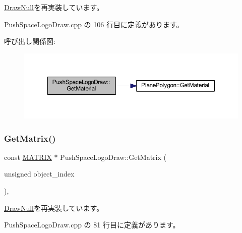 \mbox{\hyperlink{class_draw_null_a84969d22d3436986f214e9896fe44fc6}{Draw\+Null}}を再実装しています。



 Push\+Space\+Logo\+Draw.\+cpp の 106 行目に定義があります。

呼び出し関係図\+:\nopagebreak
\begin{figure}[H]
\begin{center}
\leavevmode
\includegraphics[width=350pt]{class_push_space_logo_draw_a0734eed4096afb12e6c9ef1f4d82b9d8_cgraph}
\end{center}
\end{figure}
\mbox{\label{class_push_space_logo_draw_a1ab6229ba2d68b730797f5016c99f359}} 
\subsubsection{\texorpdfstring{Get\+Matrix()}{GetMatrix()}}
{\footnotesize\ttfamily const \mbox{\hyperlink{_vector3_d_8h_a032295cd9fb1b711757c90667278e744}{M\+A\+T\+R\+IX}} $\ast$ Push\+Space\+Logo\+Draw\+::\+Get\+Matrix (\begin{DoxyParamCaption}\item[{unsigned}]{object\+\_\+index }\end{DoxyParamCaption})\hspace{0.3cm}{\ttfamily [override]}, {\ttfamily [virtual]}}



\mbox{\hyperlink{class_draw_null_adede079e9c11a756090740b20bb43022}{Draw\+Null}}を再実装しています。



 Push\+Space\+Logo\+Draw.\+cpp の 81 行目に定義があります。

